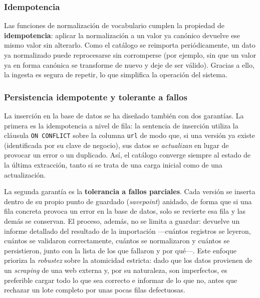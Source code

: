 \subsubsection*{Idempotencia}

Las funciones de normalización de vocabulario cumplen la propiedad de
\textbf{idempotencia}: aplicar la normalización a un valor ya canónico devuelve
ese mismo valor sin alterarlo. Como el catálogo se reimporta periódicamente, un
dato ya normalizado puede reprocesarse sin corromperse (por ejemplo, sin que un
valor ya en forma canónica se transforme de nuevo y deje de ser válido). Gracias
a ello, la ingesta es segura de repetir, lo que simplifica la operación del
sistema.

\subsubsection*{Persistencia idempotente y tolerante a fallos}

La inserción en la base de datos se ha diseñado también con dos garantías. La
primera es la idempotencia a nivel de fila: la sentencia de inserción utiliza la
cláusula \texttt{ON CONFLICT} sobre la columna \texttt{url} de modo que, si una
versión ya existe (identificada por su clave de negocio), sus datos se
\emph{actualizan} en lugar de provocar un error o un duplicado. Así, el catálogo
converge siempre al estado de la última extracción, tanto si se trata de una
carga inicial como de una actualización.

La segunda garantía es la \textbf{tolerancia a fallos parciales}. Cada versión se
inserta dentro de su propio punto de guardado (\emph{savepoint}) anidado, de
forma que si una fila concreta provoca un error en la base de datos, solo se
revierte esa fila y las demás se conservan. El proceso, además, no se limita a
guardar: devuelve un informe detallado del resultado de la importación —cuántos
registros se leyeron, cuántos se validaron correctamente, cuántos se normalizaron
y cuántos se persistieron, junto con la lista de los que fallaron y por qué—.
Este enfoque prioriza la \emph{robustez} sobre la atomicidad estricta: dado que
los datos provienen de un \emph{scraping} de una web externa y, por su
naturaleza, son imperfectos, es preferible cargar todo lo que sea correcto e
informar de lo que no, antes que rechazar un lote completo por unas pocas filas
defectuosas.


